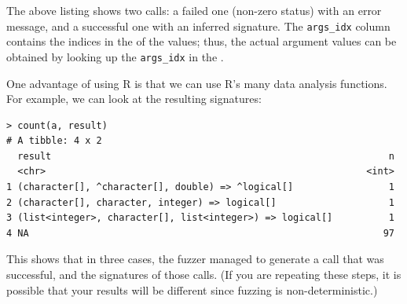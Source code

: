 \documentclass[sigplan,nonacm,anonymous,review]{acmart}
\begin{document}
The above listing shows two calls: a failed one (non-zero status) with an error message, and a successful one with an inferred signature.
The \texttt{args\_idx} column contains the indices in the \sxpdb of the values; thus, the actual argument values can be obtained by looking up the {\tt args\_idx} in the \sxpdb.

One advantage of using R is that we can use R's many data analysis functions.
For example, we can look at the resulting signatures:

\begin{lstlisting}
> count(a, result)
# A tibble: 4 x 2
  result                                                            n
  <chr>                                                         <int>
1 (character[], ^character[], double) => ^logical[]                 1
2 (character[], character, integer) => logical[]                    1
3 (list<integer>, character[], list<integer>) => logical[]          1
4 NA                                                               97
\end{lstlisting}

This shows that in three cases, the fuzzer managed to generate a call that was successful, and the signatures of those calls.
(If you are repeating these steps, it is possible that your results will be different since fuzzing is non-deterministic.)
\end{document}
